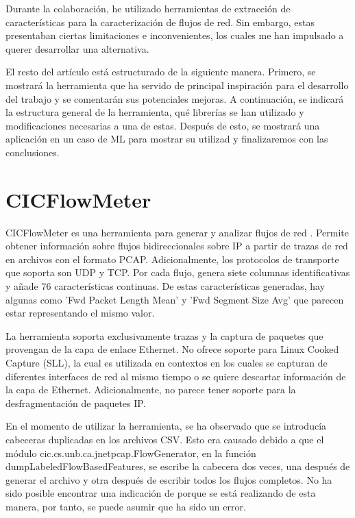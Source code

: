 \documentclass[10pt,a4paper,twoside]{article}
\begin{document}
\begin{multicols}{2}
    Durante la colaboración, he utilizado herramientas de extracción de características para la caracterización de flujos de red. Sin embargo, estas presentaban ciertas limitaciones e inconvenientes, los cuales me han impulsado a querer desarrollar una alternativa.

    El resto del artículo está estructurado de la siguiente manera. Primero, se mostrará la herramienta que ha servido de principal inspiración para el desarrollo del trabajo y se comentarán sus potenciales mejoras. A continuación, se indicará la estructura general de la herramienta, qué librerías se han utilizado y modificaciones necesarias a una de estas. Después de esto, se mostrará una aplicación en un caso de ML para mostrar su utilizad y finalizaremos con las conclusiones.

    \section{CICFlowMeter}

    CICFlowMeter es una herramienta para generar y analizar flujos de red \cite{cicflowpost} \cite{icissp17} \cite{cicflowrepo}. Permite obtener información sobre flujos bidireccionales sobre IP a partir de trazas de red en archivos con el formato PCAP. Adicionalmente, los protocolos de transporte que soporta son UDP y TCP. Por cada flujo, genera siete columnas identificativas y añade 76 características continuas. De estas características generadas, hay algunas como 'Fwd Packet Length Mean' y 'Fwd Segment Size Avg' que parecen estar representando el mismo valor.

    La herramienta soporta exclusivamente trazas y la captura de paquetes que provengan de la capa de enlace Ethernet. No ofrece soporte para Linux Cooked Capture (SLL), la cual es utilizada en contextos en los cuales se capturan de diferentes interfaces de red al mismo tiempo o se quiere descartar información de la capa de Ethernet. Adicionalmente, no parece tener soporte para la desfragmentación de paquetes IP.

    En el momento de utilizar la herramienta, se ha observado que se introducía cabeceras duplicadas en los archivos CSV. Esto era causado debido a que el módulo cic.cs.unb.ca.jnetpcap.FlowGenerator, en la función dumpLabeledFlowBasedFeatures, se escribe la cabecera dos veces, una después de generar el archivo y otra después de escribir todos los flujos completos. No ha sido posible encontrar una indicación de porque se está realizando de esta manera, por tanto, se puede asumir que ha sido un error.


\end{multicols}
\end{document}
